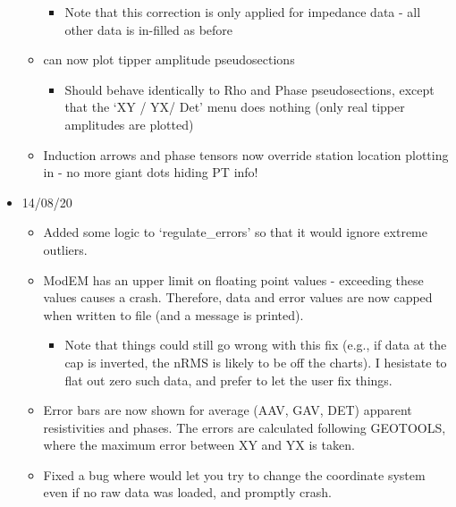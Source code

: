 \documentclass[letterpaper,10pt,english]{sphinxmanual}
\begin{document}
\begin{itemize}
\begin{itemize}
\begin{itemize}
\item {} 
Note that this correction is only applied for impedance data - all other data is in-filled as before

\end{itemize}

\item {} 
{\hyperref[\detokenize{content/data_plot/map_viewer:map-viewer}]{}} can now plot tipper amplitude pseudosections
\begin{itemize}
\item {} 
Should behave identically to Rho and Phase pseudosections, except that the ‘XY / YX/ Det’ menu does nothing (only real tipper amplitudes are plotted)

\end{itemize}

\item {} 
Induction arrows and phase tensors now override station location plotting in {\hyperref[\detokenize{content/data_plot/map_viewer:map-viewer}]{}} - no more giant dots hiding PT info!

\end{itemize}

\item {} 
14/08/20
\begin{itemize}
\item {} 
Added some logic to ‘regulate\_errors’ so that it would ignore extreme outliers.

\item {} 
ModEM has an upper limit on floating point values - exceeding these values causes a crash. Therefore, data and error values are now capped when written to file (and a message is printed).
\begin{itemize}
\item {} 
Note that things could still go wrong with this fix (e.g., if data at the cap is inverted, the nRMS is likely to be off the charts). I hesistate to flat out zero such data, and prefer to let the user fix things.

\end{itemize}

\item {} 
Error bars are now shown for average (AAV, GAV, DET) apparent resistivities and phases. The errors are calculated following GEOTOOLS, where the maximum error between XY and YX is taken.

\item {} 
Fixed a bug where {\hyperref[\detokenize{content/data_plot/map_viewer:map-viewer}]{}} would let you try to change the coordinate system even if no raw data was loaded, and promptly crash.


\end{itemize}
\end{itemize}
\end{document}
